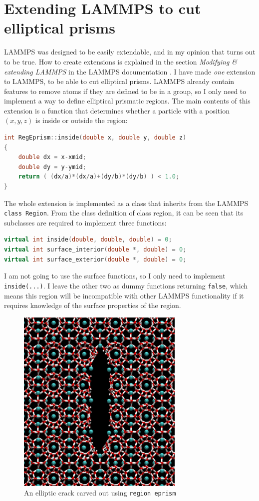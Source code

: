\section{Extending LAMMPS to cut elliptical prisms}
\label{subsec:reg_eprism}
LAMMPS was designed to be easily extendable, and in my opinion that turns out to be true. How to create extensions is explained in the section \emph{Modifying \& extending LAMMPS} in the LAMMPS documentation \cite{lammps:documentation}. I have made \emph{one} extension to LAMMPS, to be able to cut elliptical prisms. LAMMPS already contain features to remove atoms if they are defined to be in a group, so I only need to implement a way to define elliptical prismatic regions. The main contents of this extension is a function that determines whether a particle with a position $(x, y, z)$ is inside or outside the region:

\begin{lstlisting}[language=c++]
int RegEprism::inside(double x, double y, double z) 
{
	double dx = x-xmid;
	double dy = y-ymid;
	return ( (dx/a)*(dx/a)+(dy/b)*(dy/b) ) < 1.0;
}
\end{lstlisting}
The whole extension is implemented as a class that inherits from the LAMMPS {\tt class Region}. From the class definition of class region, it can be seen that its subclasses are required to implement three functions:

\begin{lstlisting}[language=c++]
virtual int inside(double, double, double) = 0;
virtual int surface_interior(double *, double) = 0;
virtual int surface_exterior(double *, double) = 0;
\end{lstlisting}
I am not going to use the surface functions, so I only need to implement {\tt inside(...)}. I leave the other two as dummy functions returning {\tt false}, which means this region will be incompatible with other LAMMPS functionality if it requires knowledge of the surface properties of the region.

\begin{figure}
\centering
\includegraphics[width=8cm]{../snapshots/carved_crack.pdf}
\caption{An elliptic crack carved out using {\tt region eprism}}
\end{figure}


